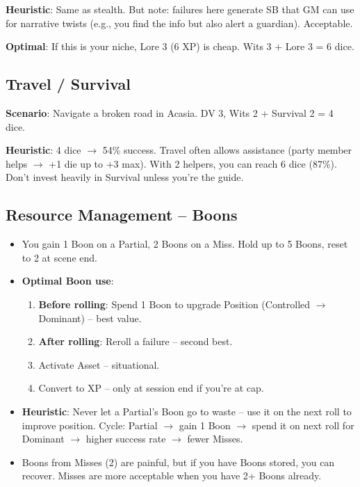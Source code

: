 \documentclass[11pt]{article}
\begin{document}
\textbf{Heuristic}: Same as stealth. But note: failures here generate SB that GM can use for narrative twists (e.g., you find the info but also alert a guardian). Acceptable.

\textbf{Optimal}: If this is your niche, Lore 3 (6 XP) is cheap. Wits 3 + Lore 3 = 6 dice.

\subsection{Travel / Survival}
\textbf{Scenario}: Navigate a broken road in Acasia. DV 3, Wits 2 + Survival 2 = 4 dice.

\textbf{Heuristic}: 4 dice $\rightarrow$ 54\% success. Travel often allows assistance (party member helps $\rightarrow$ +1 die up to +3 max). With 2 helpers, you can reach 6 dice (87\%). Don't invest heavily in Survival unless you're the guide.

\subsection{Resource Management -- Boons}
\begin{itemize}
    \item You gain 1 Boon on a Partial, 2 Boons on a Miss. Hold up to 5 Boons, reset to 2 at scene end.
    \item \textbf{Optimal Boon use}: 
        \begin{enumerate}
            \item \textbf{Before rolling}: Spend 1 Boon to upgrade Position (Controlled $\rightarrow$ Dominant) -- best value.
            \item \textbf{After rolling}: Reroll a failure -- second best.
            \item Activate Asset -- situational.
            \item Convert to XP -- only at session end if you're at cap.
        \end{enumerate}
    \item \textbf{Heuristic}: Never let a Partial's Boon go to waste -- use it on the next roll to improve position. Cycle: Partial $\rightarrow$ gain 1 Boon $\rightarrow$ spend it on next roll for Dominant $\rightarrow$ higher success rate $\rightarrow$ fewer Misses.
    \item Boons from Misses (2) are painful, but if you have Boons stored, you can recover. Misses are more acceptable when you have 2+ Boons already.
\end{itemize}
\end{document}
